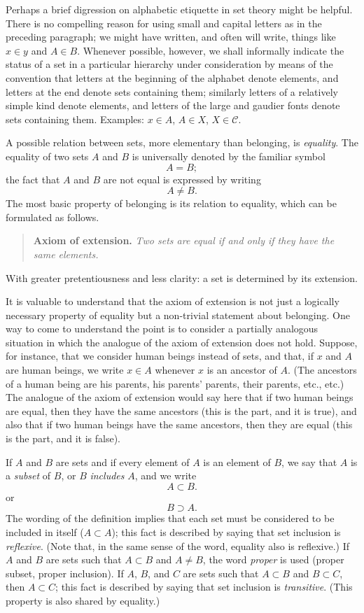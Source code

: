 Perhaps a brief digression on alphabetic etiquette in set theory
  might be helpful.
There is no compelling reason for using small and capital
  letters as in the preceding paragraph; we might have written,
  and often will write, things like $x \in y$ and $A \in B$.
Whenever possible, however, we shall informally indicate the
  status of a set in a particular hierarchy under consideration by
  means of the convention that letters at the beginning of the
  alphabet denote elements, and letters at the end denote sets
  containing them; similarly letters of a relatively simple kind
  denote elements, and letters of the large and gaudier fonts
  denote sets containing them.
Examples: $x \in A$, $A \in X$, $X \in \mathcal{C}$.

A possible relation between sets, more elementary than belonging,
  is \textit{equality}.
The equality of two sets $A$ and $B$ is universally denoted by
  the familiar symbol
  \[
  A = B;
  \]
  the fact that $A$ and $B$ are not equal is expressed by
  writing
  \[
  A \neq B.
  \]
The most basic property of belonging is its relation to
  equality, which can be formulated as follows.

\begin{quote}
\textbf{Axiom of extension.}
\textit{Two sets are equal if and only if they have the same
  elements.}
\end{quote}

With greater pretentiousness and less clarity: a set is
  determined by its extension.

It is valuable to understand that the axiom of extension is
  not just a logically necessary property of equality but a
  non-trivial statement about belonging.
One way to come to understand the point is to consider a
  partially analogous situation in which the analogue of the axiom
  of extension does not hold.
Suppose, for instance, that we consider human beings instead of
  sets, and that, if $x$ and $A$ are human beings, we write
  $x \in A$ whenever $x$ is an ancestor of $A$.
(The ancestors of a human being are his parents, his parents'
  parents, their parents, etc., etc.)
The analogue of the axiom of extension would say here that if
  two human beings are equal, then they have the same ancestors
  (this is the  part, and it is true), and also
  that if two human beings have the same ancestors, then they are
  equal (this is the  part, and it is false).

If $A$ and $B$ are sets and if every element of $A$ is an
  element of $B$, we say that $A$ is a \textit{subset} of $B$,
  or $B$ \textit{includes} $A$, and we write
  \[
  A \subset B.
  \]
  or
  \[
  B \supset A.
  \]
The wording of the definition implies that each set must be
  considered to be included in itself ($A \subset A$); this fact is
  described by saying that set inclusion is \textit{reflexive}.
  (Note that, in the same sense of the word, equality also is
  reflexive.)
If $A$ and $B$ are sets such that $A \subset B$ and $A \neq B$,
  the word \textit{proper} is used (proper subset, proper inclusion).
If $A$, $B$, and $C$ are sets such that $A \subset B$ and
  $B \subset C$, then $A \subset C$; this fact is described by
  saying that set inclusion is \textit{transitive}.
(This property is also shared by equality.)

